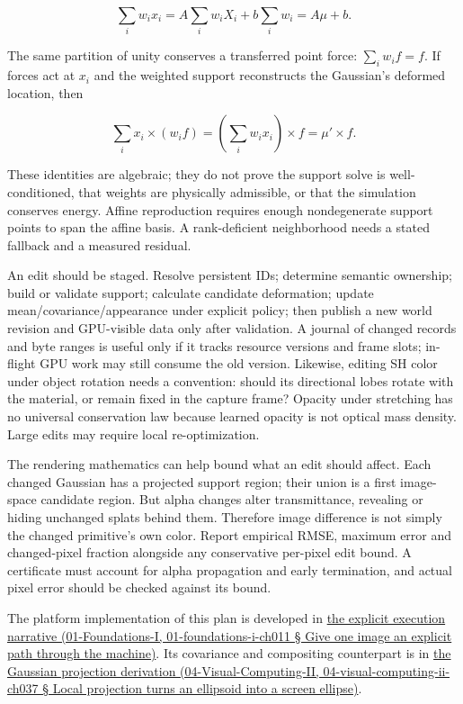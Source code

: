 \[
\sum_iw_ix_i=A\sum_iw_iX_i+b\sum_iw_i=A\mu+b.
\]

The same partition of unity conserves a transferred point force: \(\sum_iw_if=f\). If forces act at \(x_i\) and the weighted support reconstructs the Gaussian's deformed location, then

\[
\sum_ix_i\times(w_if)=\left(\sum_iw_ix_i\right)\times f=\mu'\times f.
\]

These identities are algebraic; they do not prove the support solve is well-conditioned, that weights are physically admissible, or that the simulation conserves energy. Affine reproduction requires enough nondegenerate support points to span the affine basis. A rank-deficient neighborhood needs a stated fallback and a measured residual.

An edit should be staged. Resolve persistent IDs; determine semantic ownership; build or validate support; calculate candidate deformation; update mean/covariance/appearance under explicit policy; then publish a new world revision and GPU-visible data only after validation. A journal of changed records and byte ranges is useful only if it tracks resource versions and frame slots; in-flight GPU work may still consume the old version. Likewise, editing SH color under object rotation needs a convention: should its directional lobes rotate with the material, or remain fixed in the capture frame? Opacity under stretching has no universal conservation law because learned opacity is not optical mass density. Large edits may require local re-optimization.

The rendering mathematics can help bound what an edit should affect. Each changed Gaussian has a projected support region; their union is a first image-space candidate region. But alpha changes alter transmittance, revealing or hiding unchanged splats behind them. Therefore image difference is not simply the changed primitive's own color. Report empirical RMSE, maximum error and changed-pixel fraction alongside any conservative per-pixel edit bound. A certificate must account for alpha propagation and early termination, and actual pixel error should be checked against its bound.

The platform implementation of this plan is developed in \href{}{the explicit execution narrative (01-Foundations-I, 01-foundations-i-ch011 § Give one image an explicit path through the machine)}. Its covariance and compositing counterpart is in \href{}{the Gaussian projection derivation (04-Visual-Computing-II, 04-visual-computing-ii-ch037 § Local projection turns an ellipsoid into a screen ellipse)}.

